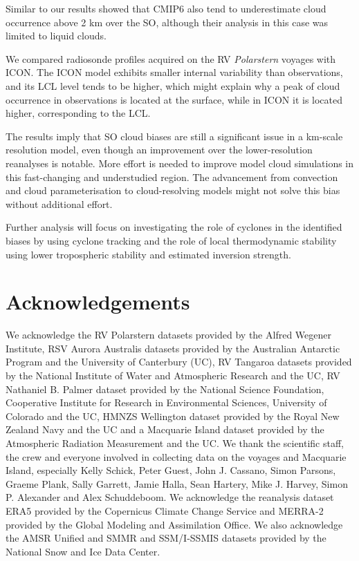 \documentclass[12pt,a4paper]{article}
\begin{document}
Similar to our results \cite{cesana2022} showed that CMIP6 also tend to
underestimate cloud occurrence above 2 km over the SO, although their analysis
in this case was limited to liquid clouds.



We compared radiosonde proﬁles acquired on the RV \emph{Polarstern} voyages
with ICON.  The ICON model exhibits smaller internal variability than
observations, and its LCL level tends to be higher, which might explain why a
peak of cloud occurrence in observations is located at the surface, while in
ICON it is located higher, corresponding to the LCL.

The results imply that SO cloud biases are still a significant
issue in a km-scale resolution model, even though an improvement over the
lower-resolution reanalyses is notable. More effort is needed to improve model
cloud simulations in this fast-changing and understudied region. The
advancement from convection and cloud parameterisation to cloud-resolving models
might not solve this bias without additional effort.

Further analysis will focus on investigating the role of cyclones in the
identified biases by using cyclone tracking and the role of local thermodynamic
stability using lower tropospheric stability and estimated inversion strength.

\section*{Acknowledgements}

We acknowledge the RV Polarstern datasets provided by the Alfred Wegener
Institute, RSV Aurora Australis datasets provided by the Australian Antarctic
Program and the University of Canterbury (UC), RV Tangaroa datasets provided by
the National Institute of Water and Atmospheric Research and the UC, RV
Nathaniel B. Palmer dataset provided by the National Science Foundation,
Cooperative Institute for Research in Environmental Sciences, University of
Colorado and the UC, HMNZS Wellington dataset provided by the Royal New Zealand
Navy and the UC and a Macquarie Island dataset provided by the Atmospheric
Radiation Measurement and the UC. We thank the scientiﬁc staff, the crew and
everyone involved in collecting data on the voyages and Macquarie Island,
especially Kelly Schick, Peter Guest, John J. Cassano, Simon
Parsons, Graeme Plank, Sally Garrett, Jamie Halla, Sean Hartery, Mike J.
Harvey, Simon P. Alexander and Alex Schuddeboom. We acknowledge the reanalysis
dataset ERA5 provided by the Copernicus Climate Change Service and MERRA-2
provided by the Global Modeling and Assimilation Office. We also acknowledge the
AMSR Uniﬁed and SMMR and SSM/I-SSMIS datasets provided by the National Snow and
Ice Data Center.
\end{document}
